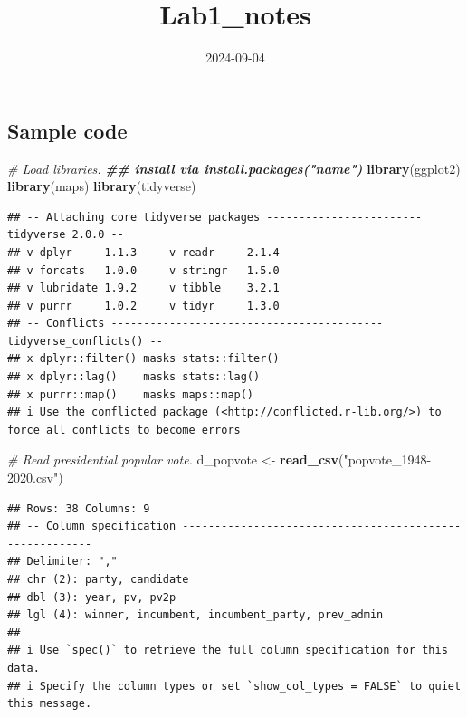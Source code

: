 \documentclass[
]{article}
\title{Lab1\_notes}
\author{}
\date{\vspace{-2.5em}2024-09-04}
\newenvironment{Shaded}{\begin{snugshade}}{\end{snugshade}}
\newcommand{\CommentTok}[1]{\textcolor[rgb]{0.56,0.35,0.01}{\textit{#1}}}
\newcommand{\DocumentationTok}[1]{\textcolor[rgb]{0.56,0.35,0.01}{\textbf{\textit{#1}}}}
\newcommand{\FunctionTok}[1]{\textcolor[rgb]{0.13,0.29,0.53}{\textbf{#1}}}
\newcommand{\NormalTok}[1]{#1}
\newcommand{\OtherTok}[1]{\textcolor[rgb]{0.56,0.35,0.01}{#1}}
\newcommand{\StringTok}[1]{\textcolor[rgb]{0.31,0.60,0.02}{#1}}
\begin{document}
\maketitle

\subsection{Sample code}\label{sample-code}

\begin{Shaded}
\begin{Highlighting}[]
\CommentTok{\# Load libraries.}
\DocumentationTok{\#\# install via \textasciigrave{}install.packages("name")\textasciigrave{}}
\FunctionTok{library}\NormalTok{(ggplot2)}
\FunctionTok{library}\NormalTok{(maps)}
\FunctionTok{library}\NormalTok{(tidyverse)}
\end{Highlighting}
\end{Shaded}

\begin{verbatim}
## -- Attaching core tidyverse packages ------------------------ tidyverse 2.0.0 --
## v dplyr     1.1.3     v readr     2.1.4
## v forcats   1.0.0     v stringr   1.5.0
## v lubridate 1.9.2     v tibble    3.2.1
## v purrr     1.0.2     v tidyr     1.3.0
## -- Conflicts ------------------------------------------ tidyverse_conflicts() --
## x dplyr::filter() masks stats::filter()
## x dplyr::lag()    masks stats::lag()
## x purrr::map()    masks maps::map()
## i Use the conflicted package (<http://conflicted.r-lib.org/>) to force all conflicts to become errors
\end{verbatim}

\begin{Shaded}
\begin{Highlighting}[]
\CommentTok{\# Read presidential popular vote. }
\NormalTok{d\_popvote }\OtherTok{\textless{}{-}} \FunctionTok{read\_csv}\NormalTok{(}\StringTok{"popvote\_1948{-}2020.csv"}\NormalTok{)}
\end{Highlighting}
\end{Shaded}

\begin{verbatim}
## Rows: 38 Columns: 9
## -- Column specification --------------------------------------------------------
## Delimiter: ","
## chr (2): party, candidate
## dbl (3): year, pv, pv2p
## lgl (4): winner, incumbent, incumbent_party, prev_admin
## 
## i Use `spec()` to retrieve the full column specification for this data.
## i Specify the column types or set `show_col_types = FALSE` to quiet this message.
\end{verbatim}
\end{document}
